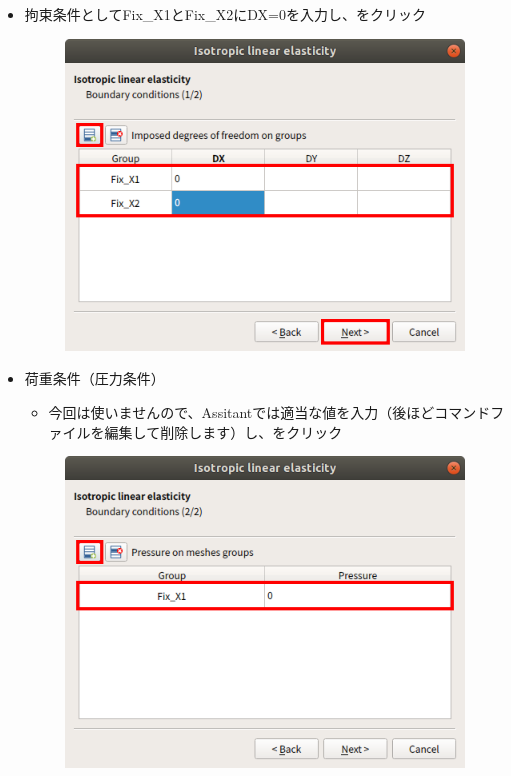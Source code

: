 \begin{itemize}
\begin{figure}[H]
	      \end{figure}
	      \clearpage
	\item 拘束条件としてFix\_X1とFix\_X2にDX=0を入力し、をクリック
	      \begin{figure}[H]
		      \centering
		      \includegraphics{fig/meca005.png}
	      \end{figure}
	      \clearpage
	\item 荷重条件（圧力条件）
	      \begin{itemize}
		      \item 今回は使いませんので、Assitantでは適当な値を入力（後ほどコマンドファイルを編集して削除します）し、をクリック
	      \end{itemize}
	      \begin{figure}[H]
		      \centering
		      \includegraphics{fig/meca006.png}

\end{figure}
\end{itemize}
